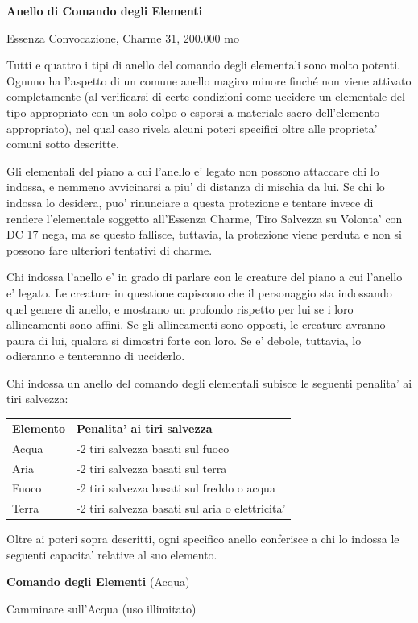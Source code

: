 \documentclass[a4paper,11pt,twoside,openany]{book}
\begin{document}
\textbf{Anello di Comando degli Elementi}

Essenza Convocazione, Charme 31, 200.000 mo

Tutti e quattro i tipi di anello del comando degli elementali sono molto potenti. Ognuno ha l'aspetto di un comune anello magico minore finché non viene attivato completamente (al verificarsi di certe condizioni come uccidere un elementale del tipo appropriato con un solo colpo o esporsi a materiale sacro dell'elemento appropriato), nel qual caso rivela alcuni poteri specifici oltre alle proprieta' comuni sotto descritte.

Gli elementali del piano a cui l'anello e' legato non possono attaccare chi lo indossa, e nemmeno avvicinarsi a piu' di distanza di mischia da lui. Se chi lo indossa lo desidera, puo' rinunciare a questa protezione e tentare invece di rendere l'elementale soggetto all'Essenza Charme, Tiro Salvezza su Volonta' con DC 17 nega, ma se questo fallisce, tuttavia, la protezione viene perduta e non si possono fare ulteriori tentativi di charme.

Chi indossa l'anello e' in grado di parlare con le creature del piano a cui l'anello e' legato. Le creature in questione capiscono che il personaggio sta indossando quel genere di anello, e mostrano un profondo rispetto per lui se i loro allineamenti sono affini. Se gli allineamenti sono opposti, le creature avranno paura di lui, qualora si dimostri forte con loro. Se e' debole, tuttavia, lo odieranno e tenteranno di ucciderlo.

Chi indossa un anello del comando degli elementali subisce le seguenti
penalita' ai tiri salvezza:

\begin{tabular}{ll}
\toprule
\textbf{Elemento} & \textbf{Penalita' ai tiri salvezza}\tabularnewline
Acqua & -2 tiri salvezza basati sul fuoco\tabularnewline
Aria & -2 tiri salvezza basati sul terra\tabularnewline
Fuoco & -2 tiri salvezza basati sul freddo o acqua\tabularnewline
Terra & -2 tiri salvezza basati sul aria o elettricita'\tabularnewline

\end{tabular}

Oltre ai poteri sopra descritti, ogni specifico anello conferisce
a chi lo indossa le seguenti capacita' relative al suo elemento.

\textbf{Comando degli Elementi} (Acqua)

Camminare sull'Acqua (uso illimitato)
\end{document}
